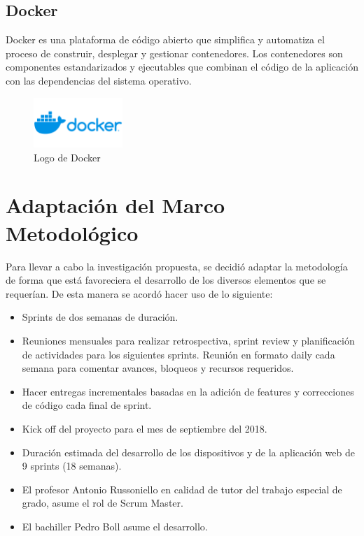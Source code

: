 \subsection{Docker}
Docker es una plataforma de código abierto que simplifica y automatiza el proceso de construir, desplegar y gestionar contenedores. Los contenedores son componentes estandarizados y ejecutables que combinan el código de la aplicación con las dependencias del sistema operativo.
\begin{figure}[ht]
\vspace*{-20pt}
\centering
\includegraphics[width=0.3\textwidth]{Figuras/Docker-Logo.png}
\caption{\label{fig:docker-logo}Logo de Docker}
\vspace*{-10pt}
\end{figure}

\section{Adaptación del Marco Metodológico}
Para llevar a cabo la investigación propuesta, se decidió adaptar la metodología de forma que está favoreciera el desarrollo de los diversos elementos que se requerían. De esta manera se acordó hacer uso de lo siguiente:
\begin{itemize}
\item Sprints de dos semanas de duración.
\item Reuniones mensuales para realizar retrospectiva, sprint review y planificación de actividades para los siguientes sprints. Reunión en formato daily cada semana para comentar avances, bloqueos y recursos requeridos.  
\item Hacer entregas incrementales basadas en la adición de features y correcciones de código cada final de sprint.
\item Kick off del proyecto para el mes de septiembre del 2018.
\item Duración estimada del desarrollo de los dispositivos y de la aplicación web de 9 sprints (18 semanas).
\item El profesor Antonio Russoniello en calidad de tutor del trabajo especial de grado, asume el rol de Scrum Master. 
\item El bachiller Pedro Boll asume el desarrollo. 
\end{itemize}

